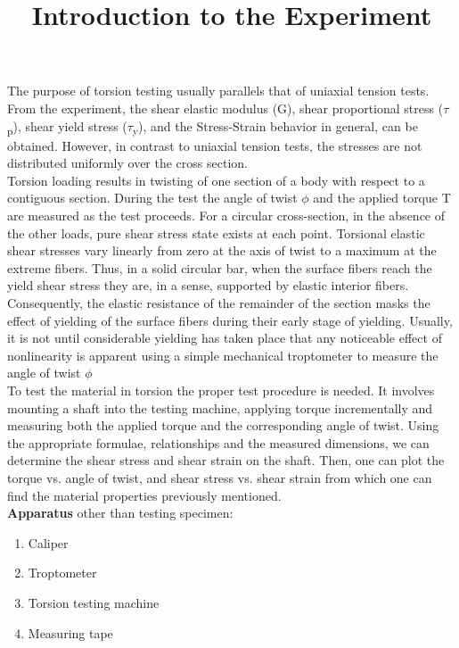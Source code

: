 \documentclass[12pt,a4paper]{article}	%
\title{Introduction to the Experiment}
\date{\vspace{-5ex}}	%
\begin{document}
\maketitle
\thispagestyle{empty}	%
\large
The purpose of torsion testing usually parallels that of uniaxial tension tests. From the experiment, the shear elastic modulus (G), shear proportional stress ($\tau$\textsubscript{p}), shear yield stress ($\tau$\textsubscript{y}), and the Stress-Strain behavior in general, can be obtained. However, in contrast to uniaxial tension tests, the stresses are not distributed uniformly over the cross section. \\

Torsion loading results in twisting of one section of a body with respect to a contiguous section. During the test the angle of twist $\phi$ and the applied torque T are measured as the test proceeds. For a circular cross-section, in the absence of the other loads, pure shear stress state exists at each point. Torsional elastic shear stresses vary linearly from zero at the axis of twist to a maximum at the extreme fibers. Thus, in a solid circular bar, when the surface fibers reach the yield shear stress they are, in a sense, supported by elastic interior fibers. Consequently, the elastic resistance of the remainder of the section masks the effect of yielding of the surface fibers during their early stage of yielding. Usually, it is not until considerable yielding has taken place that any noticeable effect of nonlinearity is apparent using a simple mechanical troptometer to measure the angle of twist $\phi$ \\

To test the material in torsion the proper test procedure is needed. It involves mounting a shaft into the testing machine, applying torque incrementally and measuring both the applied torque and the corresponding angle of twist. Using the appropriate formulae, relationships and the measured dimensions, we can determine the shear stress and shear strain on the shaft. Then, one can plot the torque vs. angle of twist, and shear stress vs. shear strain from which one can find the material properties previously mentioned. \\

\textbf{Apparatus} other than testing specimen:
\begin{enumerate}
\item Caliper 
\item Troptometer 
\item Torsion testing machine 
\item Measuring tape
\end{enumerate}
\end{document}

